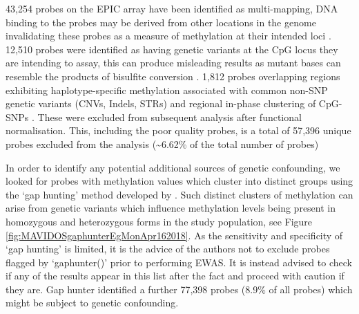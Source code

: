 \documentclass[]{book}
\begin{document}
43,254 probes on the EPIC array have been identified as multi-mapping, DNA binding to the probes may be derived from other locations in the genome invalidating these probes as a measure of methylation at their intended loci \citep{Pidsley2016}. 12,510 probes were identified as having genetic variants at the CpG locus they are intending to assay, this can produce misleading results as mutant bases can resemble the products of bisulfite conversion \citep{Pidsley2016}. 1,812 probes overlapping regions exhibiting haplotype-specific methylation associated with common non-SNP genetic variants (CNVs, Indels, STRs) and regional in-phase clustering of CpG-SNPs \citep{Bell2017a}. These were excluded from subsequent analysis after functional normalisation. This, including the poor quality probes, is a total of 57,396 unique probes excluded from the analysis (\textasciitilde6.62\% of the total number of probes)

In order to identify any potential additional sources of genetic confounding, we looked for probes with methylation values which cluster into distinct groups using the `gap hunting' method developed by \citet{Andrews2016}. Such distinct clusters of methylation can arise from genetic variants which influence methylation levels being present in homozygous and heterozygous forms in the study population, see Figure \ref{fig:MAVIDOSgaphunterEgMonApr162018}. As the sensitivity and specificity of `gap hunting' is limited, it is the advice of the authors not to exclude probes flagged by `gaphunter()' prior to performing EWAS. It is instead advised to check if any of the results appear in this list after the fact and proceed with caution if they are. Gap hunter identified a further 77,398 probes (8.9\% of all probes) which might be subject to genetic confounding.
\end{document}
